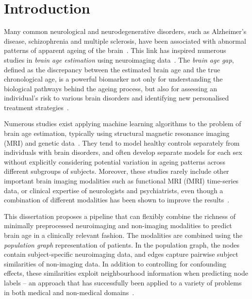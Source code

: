 \chapter{Introduction}



Many common neurological and neurodegenerative disorders, such as Alzheimer’s disease, schizophrenia and multiple sclerosis, have been associated with abnormal patterns of apparent ageing of the brain~\cite{kaufmann2019}. This link has inspired numerous studies in \textit{brain age estimation} using neuroimaging data~\cite{franke2019ten}. The \textit{brain age gap}, defined as the discrepancy between the estimated brain age and the true chronological age, is a powerful biomarker not only for understanding the biological pathways behind the ageing process, but also for assessing an individual’s risk to various brain disorders and identifying new personalised treatment strategies~\cite{tuncc2019deviation}.

Numerous studies exist applying machine learning algorithms to the problem of brain age estimation, typically using structural magnetic resonance imaging (MRI) and genetic data~\cite{franke2019ten}. They tend to model healthy controls separately from individuals with brain disorders, and often develop separate models for each sex~\cite{kaufmann2019,niu2019improved} without explicitly considering potential variation in ageing patterns across different subgroups of subjects. Moreover, these studies rarely include other important brain imaging modalities such as functional MRI (fMRI) time-series data, or clinical expertise of neurologists and psychiatrists, even though a combination of different modalities has been shown to improve the results~\cite{niu2019improved}. 

This dissertation proposes a pipeline that can flexibly combine the richness of minimally preprocessed neuroimaging and non-imaging modalities to predict brain age in a clinically relevant fashion. The modalities are combined using the \textit{population graph} representation of patients. In the population graph, the nodes contain subject-specific neuroimaging data, and edges capture pairwise subject similarities of non-imaging data. In addition to controlling for confounding effects, these similarities exploit neighbourhood information when predicting node labels – an approach that has successfully been applied to a variety of problems in both medical and non-medical domains~\cite{parisot2018disease}. 

